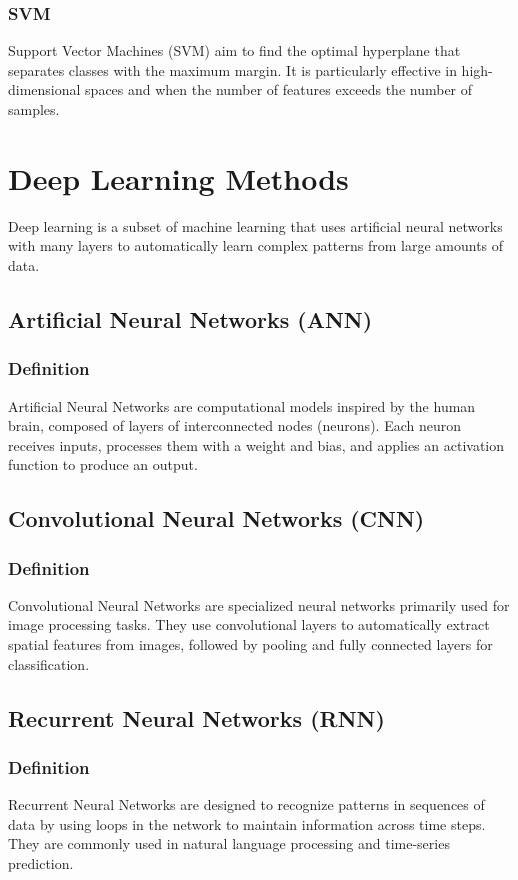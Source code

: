 \subsubsection{SVM}
Support Vector Machines (SVM) aim to find the optimal hyperplane that separates classes with the maximum margin. It is particularly effective in high-dimensional spaces and when the number of features exceeds the number of samples.

\section{Deep Learning Methods}
Deep learning is a subset of machine learning that uses artificial neural networks with many layers to automatically learn complex patterns from large amounts of data.

\subsection{Artificial Neural Networks (ANN)}
\subsubsection{Definition}
Artificial Neural Networks are computational models inspired by the human brain, composed of layers of interconnected nodes (neurons). Each neuron receives inputs, processes them with a weight and bias, and applies an activation function to produce an output.

\subsection{Convolutional Neural Networks (CNN)}
\subsubsection{Definition}
Convolutional Neural Networks are specialized neural networks primarily used for image processing tasks. They use convolutional layers to automatically extract spatial features from images, followed by pooling and fully connected layers for classification.

\subsection{Recurrent Neural Networks (RNN)}
\subsubsection{Definition}
Recurrent Neural Networks are designed to recognize patterns in sequences of data by using loops in the network to maintain information across time steps. They are commonly used in natural language processing and time-series prediction.

